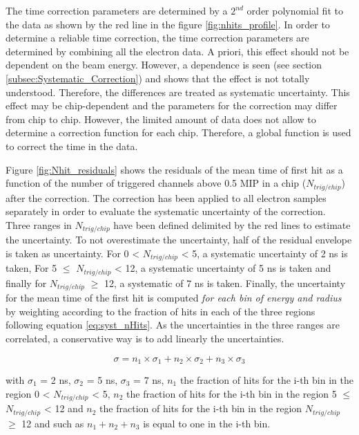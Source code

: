 The time correction parameters are determined by a $2^{nd}$ order polynomial fit to the data as shown by the red line in the figure \ref{fig:nhits_profile}. In order to determine a reliable time correction, the time correction parameters are determined by combining all the electron data. A priori, this effect should not be dependent on the beam energy. However, a dependence is seen (see section \ref{subsec:Systematic_Correction}) and shows that the effect is not totally understood. Therefore, the differences are treated as systematic uncertainty. This effect may be chip-dependent and the parameters for the correction may differ from chip to chip. However, the limited amount of data does not allow to determine a correction function for each chip. Therefore, a global function is used to correct the time in the data.

Figure \ref{fig:Nhit_residuals} shows the residuals of the mean time of first hit as a function of the number of triggered channels above 0.5 MIP in a chip ($N_{trig/chip}$) after the correction. The correction has been applied to all electron samples separately in order to evaluate the systematic uncertainty of the correction. Three ranges in $N_{trig/chip}$ have been defined delimited by the red lines to estimate the uncertainty. To not overestimate the uncertainty, half of the residual envelope is taken as uncertainty. For 0 < $N_{trig/chip}$ < 5, a systematic uncertainty of 2 ns is taken, For 5 $\leq$ $N_{trig/chip}$ < 12, a systematic uncertainty of 5 ns is taken and finally for $N_{trig/chip}$ $\geq$ 12, a systematic of 7 ns is taken. Finally, the uncertainty for the mean time of the first hit is computed \textit{for each bin of energy and radius} by weighting according to the fraction of hits in each of the three regions following equation \ref{eq:syst_nHits}. As the uncertainties in the three ranges are correlated, a conservative way is to add linearly the uncertainties.

\begin{equation}
	\sigma = n_1 \times \sigma_1 + n_2 \times \sigma_2 + n_3 \times \sigma_3 \label{eq:syst_nHits}
\end{equation}

with $\sigma_1$ = 2 ns, $\sigma_2$ = 5 ns, $\sigma_3$ = 7 ns, $n_1$ the fraction of hits for the i-th bin in the region 0 < $N_{trig/chip}$ < 5, $n_2$ the fraction of hits for the i-th bin in the region 5 $\leq$ $N_{trig/chip}$ < 12 and $n_2$ the fraction of hits for the i-th bin in the region $N_{trig/chip}$ $\geq$ 12 and such as $n_1 + n_2 + n_3$ is equal to one in the i-th bin.

